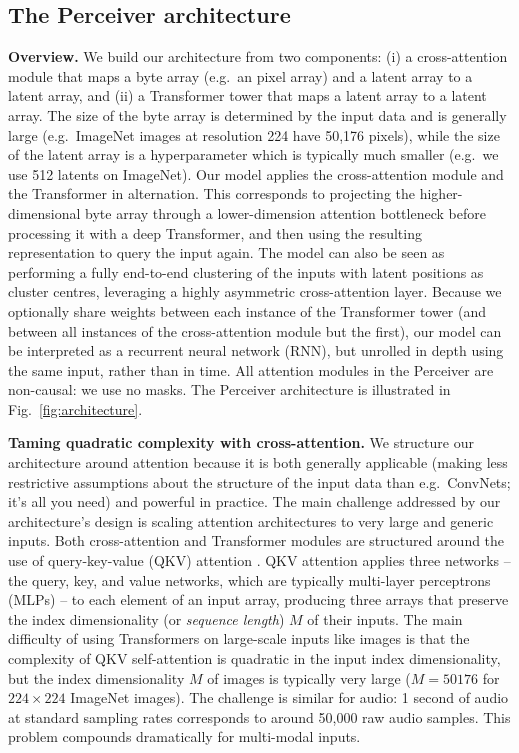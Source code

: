 \subsection{The Perceiver architecture}

 \textbf{Overview.} We build our architecture from two components: (i) a cross-attention module that maps a byte array (e.g.\ an pixel array) and a latent array to a latent array, and (ii) a Transformer tower that maps a latent array to a latent array. The size of the byte array is determined by the input data and is generally large (e.g.\ ImageNet images at resolution 224 have 50,176 pixels), while the size of the latent array is a hyperparameter which is typically much smaller (e.g.\ we use 512 latents on ImageNet). Our model applies the cross-attention module and the Transformer in alternation. This corresponds to projecting the higher-dimensional byte array through a lower-dimension attention bottleneck before processing it with a deep Transformer, and then using the resulting representation to query the input again. The model can also be seen as performing a fully end-to-end clustering of the inputs with latent positions as cluster centres, leveraging a highly asymmetric cross-attention layer. Because we optionally share weights between each instance of the Transformer tower (and between all instances of the cross-attention module but the first), our model can be interpreted as a recurrent neural network (RNN), but unrolled in depth using the same input, rather than in time. All attention modules in the Perceiver are non-causal: we use no masks. The Perceiver architecture is illustrated in Fig.~\ref{fig:architecture}.

 \textbf{Taming quadratic complexity with cross-attention.} We structure our architecture around attention because it is both generally applicable (making less restrictive assumptions about the structure of the input data than e.g.\ ConvNets; it's all you need) and powerful in practice. The main challenge addressed by our architecture's design is scaling attention architectures to very large and generic inputs. Both cross-attention and Transformer modules are structured around the use of query-key-value (QKV) attention \cite{graves2014neural,weston2014memory,bahdanau2015neural}. QKV attention applies three networks -- the query, key, and value networks, which are typically multi-layer perceptrons (MLPs) -- to each element of an input array, producing three arrays that preserve the index dimensionality (or \textit{sequence length}) $M$ of their inputs. The main difficulty of using Transformers on large-scale inputs like images is that the complexity of QKV self-attention is quadratic in the input index dimensionality, but the index dimensionality $M$ of images is typically very large ($M=50176$ for $224 \times 224$ ImageNet images). The challenge is similar for audio: 1 second of audio at standard sampling rates corresponds to around 50,000 raw audio samples. This problem compounds dramatically for multi-modal inputs.


